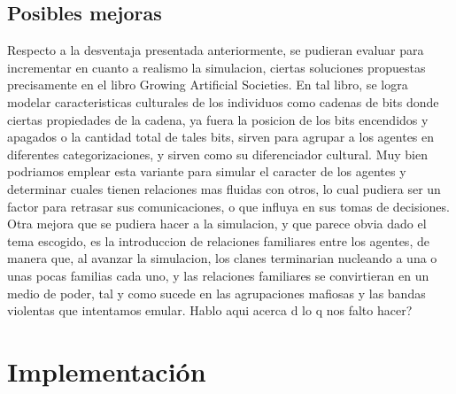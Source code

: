 \documentclass[11pt]{article}
\begin{document}
\subsection{Posibles mejoras}
Respecto a la desventaja presentada anteriormente, se pudieran evaluar para incrementar en cuanto a realismo la simulacion, ciertas soluciones propuestas precisamente en el libro Growing Artificial Societies. En tal libro, se logra modelar caracteristicas culturales de los individuos como cadenas de bits donde ciertas propiedades de la cadena, ya fuera la posicion de los bits encendidos y apagados o la cantidad total de tales bits, sirven para agrupar a los agentes en diferentes categorizaciones, y sirven como su diferenciador cultural. Muy bien podriamos emplear esta variante para simular el caracter de los agentes y determinar cuales tienen relaciones mas fluidas con otros, lo cual pudiera ser un factor para retrasar sus comunicaciones, o que influya en sus tomas de decisiones.
Otra mejora que se pudiera hacer a la simulacion, y que parece obvia dado el tema escogido, es la introduccion de relaciones familiares entre los agentes, de manera que, al avanzar la simulacion, los clanes terminarian nucleando a una o unas pocas familias cada uno, y las relaciones familiares se convirtieran en un medio de poder, tal y como sucede en las agrupaciones mafiosas y las bandas violentas que intentamos emular.
Hablo aqui acerca d lo q nos falto hacer?

\section{Implementación}
\end{document}
